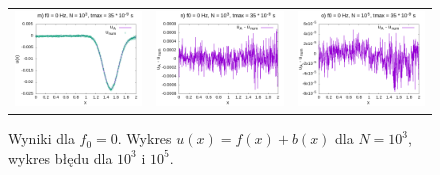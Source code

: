 \documentclass[11pt,a4paper]{report}
\begin{document}
\begin{figure}
\begin{tabular}{ccc}
\includegraphics[width=55mm]{plots/0/mc0_3_35} &   \includegraphics[width=55mm]{plots/0/mc0_3_35_dif} &   \includegraphics[width=55mm]{plots/0/mc0_5_35_dif} \\
\end{tabular}
\caption{Wyniki dla $f_0 = 0$. Wykres $u(x) = f(x)+b(x)$ dla $N = 10^3$, wykres błędu dla $10^3$ i $10^5$.}
\end{figure}
\newpage
\end{document}
